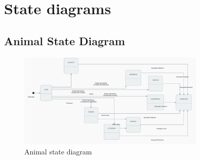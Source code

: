 \documentclass[a4paper,12pt]{article}
\begin{document}
\newpage
\section{\textbf{State diagrams}}
\subsection{Animal State Diagram}
\begin{figure}[H]
    \centering
    \includegraphics[width=0.8\textwidth]{state-diagram.png}
    \caption{Animal state diagram}
    \label{fig:animal-state-diagram}
\end{figure}
\end{document}

